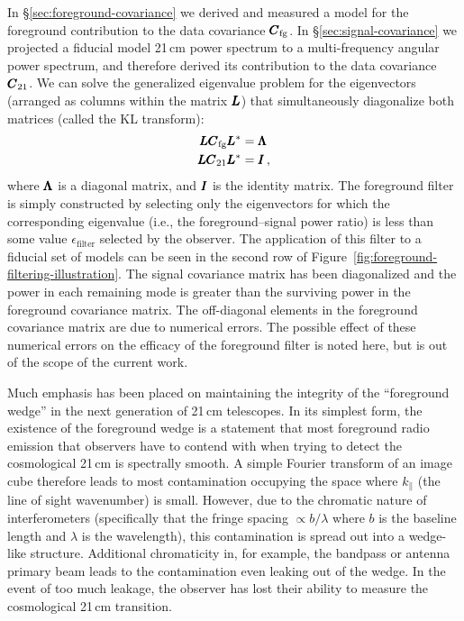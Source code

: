 \begin{bibunit}
In \S\ref{sec:foreground-covariance} we derived and measured a model for the foreground contribution
to the data covariance $\pmb C_\text{fg}$. In \S\ref{sec:signal-covariance} we projected a fiducial
model 21\,cm power spectrum to a multi-frequency angular power spectrum, and therefore derived its
contribution to the data covariance $\pmb C_\text{21}$. We can solve the generalized eigenvalue
problem for the eigenvectors (arranged as columns within the matrix $\pmb L$) that simultaneously
diagonalize both matrices (called the KL transform):
\begin{align}
    \pmb L\pmb C_\text{fg}\pmb L^* &= \pmb\Lambda \\
    \pmb L\pmb C_\text{21}\pmb L^* &= \pmb I \,,
\end{align}
where $\pmb\Lambda$ is a diagonal matrix, and $\pmb I$ is the identity matrix. The foreground filter is
simply constructed by selecting only the eigenvectors for which the corresponding eigenvalue (i.e.,
the foreground--signal power ratio) is less than some value $\epsilon_\text{filter}$ selected by the
observer. The application of this filter to a fiducial set of models can be seen in the second row
of Figure~\ref{fig:foreground-filtering-illustration}. The signal covariance matrix has been
diagonalized and the power in each remaining mode is greater than the surviving power in the
foreground covariance matrix. The off-diagonal elements in the foreground covariance matrix are due
to numerical errors. The possible effect of these numerical errors on the efficacy of the foreground
filter is noted here, but is out of the scope of the current work.

Much emphasis has been placed on maintaining the integrity of the ``foreground wedge'' in the next
generation of 21\,cm telescopes. In its simplest form, the existence of the foreground wedge is a
statement that most foreground radio emission that observers have to contend with when trying to
detect the cosmological 21\,cm is spectrally smooth. A simple Fourier transform of an image cube
therefore leads to most contamination occupying the space where $k_\parallel$ (the line of sight
wavenumber) is small. However, due to the chromatic nature of interferometers (specifically that the
fringe spacing $\propto b/\lambda$ where $b$ is the baseline length and $\lambda$ is the
wavelength), this contamination is spread out into a wedge-like structure. Additional chromaticity
in, for example, the bandpass or antenna primary beam leads to the contamination even leaking out of
the wedge. In the event of too much leakage, the observer has lost their ability to measure the
cosmological 21\,cm transition.


\end{bibunit}
